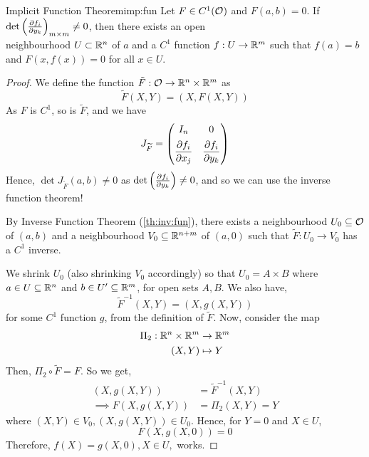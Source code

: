 \documentclass[../Analysis-3.tex]{subfiles}
\begin{document}
\begin{Thm}{Implicit Function Theorem}{imp:fun}
  Let \( F \in C^1(\mathcal{O}_{}) \) and \( F(a,b) = 0 \). If \( \det \left( \pdv{f_i}{y_k}(a,b) \right)_{m \times m} \neq 0 \), then there exists an open \\ neighbourhood \( U \subset \mathbb{R}^n \) of \( a \) and a \( C^1 \) function \( f : U \to \mathbb{R}^m \) such that \( f(a) = b \) and \( F(x,f(x)) = 0 \) for all \( x \in U \).
\end{Thm}
\begin{proof}
  We define the function \( \tilde{F} : \mathcal{O}_{} \to \mathbb{R}^n \times \mathbb{R}^m \) as
  \[
    \widetilde{F}(X,Y) = (X, F(X,Y))
  \]
  As \( F \) is \( C^1 \), so is \( \widetilde{F} \), and we have
  \[
    J_{\widetilde{F}} = \begin{pmatrix}
      I_n                         & 0                           \\[5pt]
      \displaystyle\pdv{f_i}{x_j} & \displaystyle\pdv{f_i}{y_k}
    \end{pmatrix}
  \]
  Hence, \( \det J_{\widetilde{F}}(a,b) \neq 0 \) as \( \det \left( \pdv{f_i}{y_k}(a,b) \right) \neq 0 \), and so we can use the inverse function theorem!

  By Inverse Function Theorem (\ref{th:inv:fun}), there exists a neighbourhood \( U_0 \subseteq \mathcal{O}_{} \) of \( (a,b) \) and a neighbourhood \( V_0 \subseteq \mathbb{R}^{n+m} \) of \( (a,0) \) such that \( \widetilde{F}: U_0 \to V_0 \) has a \( C^1 \) inverse.
  \smallskip

  We shrink \( U_0 \) (also shrinking \( V_0 \) accordingly) so that \( U_0 = A \times B \) where \( a \in U \subseteq \mathbb{R}^n \) and \( b \in U' \subseteq \mathbb{R}^m \), for open sets \( A,B \). We also have,
  \[
    \widetilde{F}^{-1}(X,Y) = (X, g(X,Y))
  \]
  for some \( C^1 \) function \( g \), from the definition of \( \widetilde{F} \). Now, consider the map
  \begin{align*}
    \Pi_2 : \mathbb{R}^n \times \mathbb{R}^m & \to \mathbb{R}^m  \\
    (X,Y)                    & \mapsto Y
  \end{align*}
  Then, \( \Pi_2 \circ \widetilde{F} = F \). So we get,
  \begin{align*}
    (X, g(X,Y))          & = \widetilde{F}^{-1}(X,Y) \\
    \implies F(X,g(X,Y)) & = \Pi_2(X,Y) = Y
  \end{align*}
  where \( (X,Y) \in V_0, (X,g(X,Y)) \in U_0 \). Hence, for \( Y = 0 \) and \( X \in U \),
  \[
    F(X, g(X,0)) = 0
  \]
  Therefore, \( f(X) = g(X, 0), X \in U, \) works.
\end{proof}
\pagebreak
\end{document}
